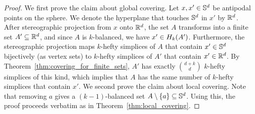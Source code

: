 \documentclass[a4paper,UKenglish,cleveref, autoref,numberwithinsect]{socg-lipics-v2021}
\newcommand {\mm}[1] {\ifmmode{#1}\else{\mbox{\(#1\)}}\fi}
\theoremstyle{plain}
\newcommand{\Rspace}        {\mm{{\mathbb R}}}
\newcommand{\Sspace}        {\mm{{\mathbb S}}}
\newcommand{\Hull}[2]       {\mm{{H}_{#1}{({#2})}}}
\begin{document}
\begin{proof}
  We first prove the claim about global covering.
  Let $x, x' \in \Sspace^d$ be antipodal points on the sphere.
  We denote the hyperplane that touches $\Sspace^d$ in $x'$ by $\Rspace^d$.
  After stereographic projection from $x$ onto $\Rspace^d$, the set $A$ transforms into a finite set $A' \subseteq \Rspace^d$, and since $A$ is $k$-balanced, we have $x' \in \Hull{k}{A'}$.
  Furthermore, the stereographic projection maps $k$-hefty simplices of $A$ that contain $x' \in \Sspace^d$ bijectively (as vertex sets) to $k$-hefty simplices of $A'$ that contain $x' \in \Rspace^d$.
  By Theorem~\ref{thm:covering_for_finite_sets}, $A'$ has exactly $\binom{d+k}{d}$ $k$-hefty simplices of this kind, which implies that $A$ has the same number of $k$-hefty simplices that contain $x'$.
  \smallskip
  We second prove the claim about local covering.
  Note that removing $a$ gives a $(k-1)$-balanced set $A\setminus\{a\} \subseteq \Sspace^d$. 
  Using this, the proof proceeds verbatim as in Theorem~\ref{thm:local_covering}.
\end{proof}
\end{document}
